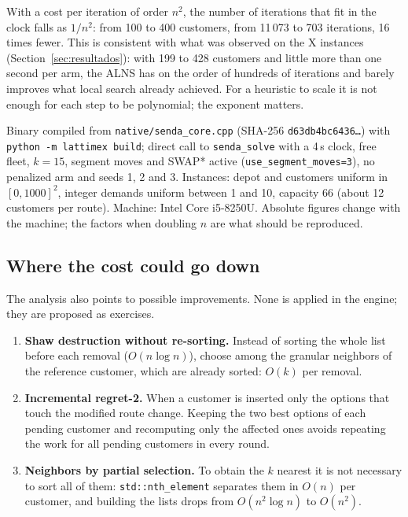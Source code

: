 \documentclass[11pt,a4paper]{article}
\newcommand{\tsl}[1]{\texttt{\small #1}}
\begin{document}
\begin{leccion}
With a cost per iteration of order $n^2$, the number of iterations that fit in the clock falls as
$1/n^2$: from 100 to 400 customers, from 11\,073 to 703 iterations, 16 times fewer. This is consistent
with what was observed on the X instances (Section~\ref{sec:resultados}): with 199 to 428 customers
and little more than one second per arm, the ALNS has on the order of hundreds of iterations and
barely improves what local search already achieved. For a heuristic to scale it is not enough for
each step to be polynomial; the exponent matters.
\end{leccion}

\begin{reproducir}
Binary compiled from \tsl{native/senda\_core.cpp} (SHA-256 \tsl{d63db4bc6436\ldots}) with
\tsl{python -m lattimex build}; direct call to \tsl{senda\_solve} with a 4\,s clock, free fleet,
$k=15$, segment moves and SWAP* active (\tsl{use\_segment\_moves=3}), no penalized arm and seeds 1, 2
and 3. Instances: depot and customers uniform in $[0,1000]^2$, integer demands uniform between 1 and
10, capacity 66 (about 12 customers per route). Machine: Intel Core i5-8250U. Absolute figures change
with the machine; the factors when doubling $n$ are what should be reproduced.
\end{reproducir}

\subsection{Where the cost could go down}

The analysis also points to possible improvements. None is applied in the engine; they are proposed
as exercises.
\begin{enumerate}[leftmargin=1.5em]
\item \textbf{Shaw destruction without re-sorting.} Instead of sorting the whole list before each
removal ($O(n\log n)$), choose among the granular neighbors of the reference customer, which are
already sorted: $O(k)$ per removal.
\item \textbf{Incremental regret-2.} When a customer is inserted only the options that touch the
modified route change. Keeping the two best options of each pending customer and recomputing only the
affected ones avoids repeating the work for all pending customers in every round.
\item \textbf{Neighbors by partial selection.} To obtain the $k$ nearest it is not necessary to sort
all of them: \tsl{std::nth\_element} separates them in $O(n)$ per customer, and building the lists
drops from $O(n^2\log n)$ to $O(n^2)$.
\end{enumerate}
\end{document}

